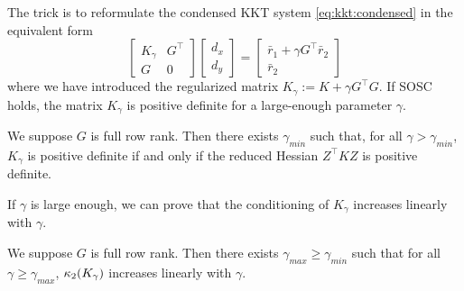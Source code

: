 The trick is to reformulate the condensed KKT system \eqref{eq:kkt:condensed} in the equivalent form
\begin{equation}
  \label{eq:kkt:hykkt}
  \begin{bmatrix}
    K_\gamma & G^\top \\
    G & 0
  \end{bmatrix}
  \begin{bmatrix}
    d_x \\ d_y
  \end{bmatrix}
  =
  \begin{bmatrix}
    \bar{r}_1 + \gamma G^\top \bar{r}_2 \\
    \bar{r}_2
  \end{bmatrix}
\end{equation}
where we have introduced the regularized matrix $K_\gamma := K + \gamma G^\top G$.
If SOSC holds, the matrix $K_\gamma$ is positive definite for a large-enough parameter $\gamma$.
\begin{proposition}
  \label{prop:kkt:hykkt:pd}
  We suppose $G$ is full row rank. Then there exists $\gamma_{min}$
  such that, for all $\gamma > \gamma_{min}$, $K_\gamma$ is positive definite
  if and only if the reduced Hessian $Z^\top K Z$ is positive definite.
\end{proposition}
If $\gamma$ is large enough, we can prove that the conditioning
of $K_\gamma$ increases linearly with $\gamma$.
\begin{proposition}
  \label{prop:kkt:hykkt:cond}
  We suppose $G$ is full row rank. Then there exists $\gamma_{max}
  \geq \gamma_{min}$ such that for all $\gamma \geq \gamma_{max}$,
  $\kappa_2(K_\gamma)$ increases linearly with $\gamma$.
\end{proposition}

